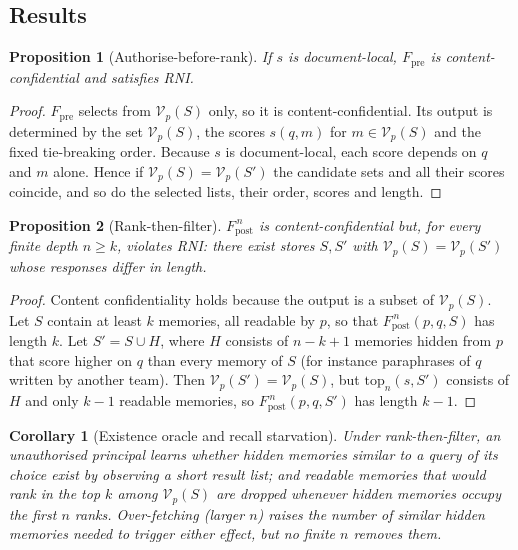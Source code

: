 \documentclass[11pt,a4paper]{article}
\newtheorem{proposition}{Proposition}
\newtheorem{corollary}{Corollary}
\theoremstyle{remark}
\newcommand{\vis}{\mathcal{V}}
\begin{document}
\subsection{Results}

\begin{proposition}[Authorise-before-rank]
\label{prop:pre}
If $s$ is document-local, $F_{\mathrm{pre}}$ is content-confidential and satisfies RNI.
\end{proposition}
\begin{proof}
$F_{\mathrm{pre}}$ selects from $\vis_p(S)$ only, so it is content-confidential. Its output is determined by
the set $\vis_p(S)$, the scores $s(q,m)$ for $m \in \vis_p(S)$ and the fixed tie-breaking order. Because $s$ is
document-local, each score depends on $q$ and $m$ alone. Hence if $\vis_p(S)=\vis_p(S')$ the candidate sets and
all their scores coincide, and so do the selected lists, their order, scores and length.
\end{proof}

\begin{proposition}[Rank-then-filter]
\label{prop:post}
$F_{\mathrm{post}}^{\,n}$ is content-confidential but, for every finite depth $n \geq k$, violates RNI: there exist
stores $S, S'$ with $\vis_p(S)=\vis_p(S')$ whose responses differ in length.
\end{proposition}
\begin{proof}
Content confidentiality holds because the output is a subset of $\vis_p(S)$. Let $S$ contain at least $k$
memories, all readable by $p$, so that $F_{\mathrm{post}}^{\,n}(p,q,S)$ has length $k$. Let $S' = S \cup H$, where $H$
consists of $n-k+1$ memories hidden from $p$ that score higher on $q$ than every memory of $S$ (for instance
paraphrases of $q$ written by another team). Then $\vis_p(S')=\vis_p(S)$, but $\mathrm{top}_n(s,S')$ consists of $H$ and
only $k-1$ readable memories, so $F_{\mathrm{post}}^{\,n}(p,q,S')$ has length $k-1$.
\end{proof}

\begin{corollary}[Existence oracle and recall starvation]
Under rank-then-filter, an unauthorised principal learns whether hidden memories similar to a query of its
choice exist by observing a short result list; and readable memories that would rank in the top $k$ among
$\vis_p(S)$ are dropped whenever hidden memories occupy the first $n$ ranks. Over-fetching (larger $n$) raises the
number of similar hidden memories needed to trigger either effect, but no finite $n$ removes them.
\end{corollary}
\end{document}
